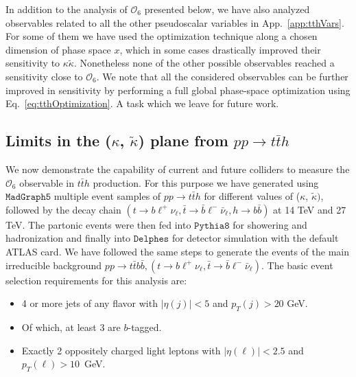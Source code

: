 \documentclass[11pt,a4paper]{article}
\newcommand{\mc}[1]{\mathcal{#1}}
\begin{document}
In addition to the analysis of $\mc{O}_{6}$ presented below, we have also analyzed observables related to all the other pseudoscalar variables in App.~\ref{app:tthVars}. For some of them we have used the optimization technique along a chosen dimension of phase space $x$, which in some cases drastically improved their sensitivity to $\kappa \tilde \kappa$. Nonetheless none of the other possible observables reached a sensitivity close to $\mc{O}_6$. We note that all the considered observables can be further improved in sensitivity by performing a full global phase-space optimization using Eq.~\eqref{eq:tthOptimization}. A task which we leave for future work.





\subsection{Limits in the ($\kappa$, $\tilde{\kappa}$) plane from $pp\to t\bar th$}
We now demonstrate the capability of current and future colliders to measure the $\mc{O}_6$ observable in $t\bar t h$ production. For this purpose we have generated using $\texttt{MadGraph5}$ multiple event samples of $p p \to t \bar{t} h$ for different values of ($\kappa$, $\tilde{\kappa})$, followed by the decay chain  $(t \to b \ell^+ \nu_\ell,\bar{t} \to \bar{b} \ell^- \bar{\nu}_\ell, h \to b \bar{b})$ at 14 TeV and 27 TeV. The partonic events were then fed into $\texttt{Pythia8}$ for showering and hadronization and finally into $\texttt{Delphes}$ for detector simulation with the default ATLAS card. We have followed the same steps to generate the events of the main irreducible background $p p \to t \bar{t} b \bar{b}, ( t \to b \ell^+ \nu_\ell,\bar{t} \to \bar{b} \ell^- \bar{\nu}_\ell)$. The basic event selection requirements for this analysis are:

\begin{itemize}
	\item 4 or more jets of any flavor with $|\eta(j)|<5$ and $p_T (j) > 20$ GeV.
	\item Of which, at least 3 are $b$-tagged.
	\item Exactly 2 oppositely charged light leptons with $|\eta(\ell)|<2.5$ and $p_T(\ell)>10$~GeV.
\end{itemize}
\end{document}

